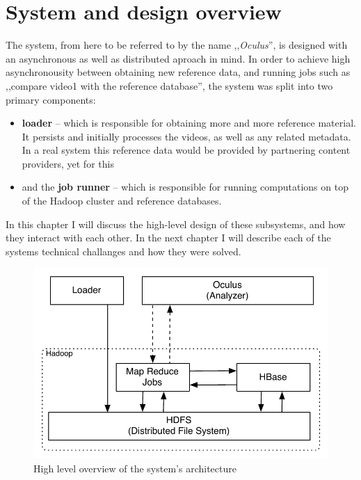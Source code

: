 \chapter{System and design overview}

The system, from here to be referred to by the name ,,\textit{Oculus}'', is designed with an asynchronous as well as distributed aproach in mind. In order to achieve high asynchronousity between obtaining new reference data, and running jobs such as ,,compare video1 with the reference database'', the system was split into two primary components: 

\begin{itemize}
  \item \textbf{loader} -- which is responsible for obtaining more and more reference material. It persists and initially processes the videos, as well as any related metadata. In a real system this reference data would be provided by partnering content providers, yet for this 
  \item and the \textbf{job runner} -- which is responsible for running computations on top of the Hadoop cluster and reference databases.
\end{itemize}

In this chapter I will discuss the high-level design of these subsystems, and how they interact with each other. In the next chapter I will describe each of the systems technical challanges and how they were solved.

\begin{figure}[hc!]
 \centering
  \includegraphics[scale=0.9]{./diagrams/high-level-system.pdf}
  \caption{High level overview of the system's architecture}
  \label{fig:system-overview}
\end{figure}

